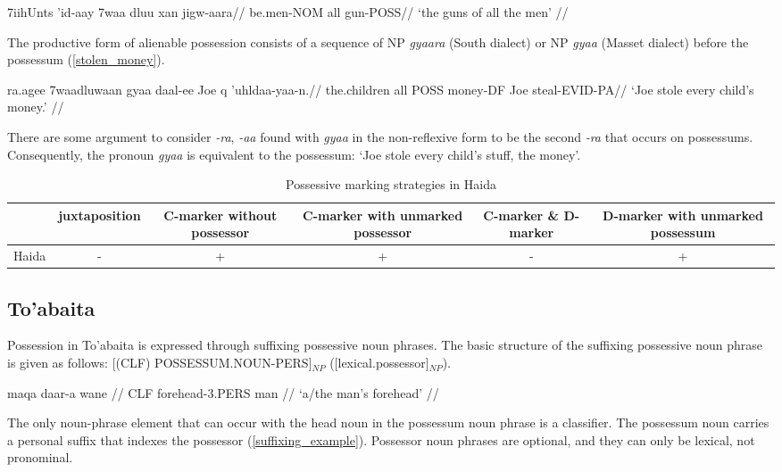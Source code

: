 \ex\label{guns_men}
\begingl
\gla 7iihUnts ’id-aay 7waa dluu xan jigw-aara//
\glb be.men-NOM all gun-POSS//
\glft ‘the guns of all the men’ //
\endgl
\xe

The productive form of alienable possession consists of a sequence of NP \textit{gyaara} (South dialect) or NP \textit{gyaa} (Masset dialect) before the possessum (\ref{stolen_money}). 

\ex\label{stolen_money}
\begingl
\gla ra.agee 7waadluwaan gyaa daal-ee Joe q ’uhldaa-yaa-n.//
\glb the.children all POSS money-DF Joe steal-EVID-PA//
\glft ‘Joe stole every child’s money.’ //
\endgl
\xe

There are some argument to consider \textit{-ra}, \textit{-aa} found with \textit{gyaa} in the non-reflexive form to be the second \textit{-ra} that occurs on possessums. Consequently, the pronoun \textit{gyaa} is equivalent to the possessum: ‘Joe stole every child’s stuff, the money’.


\begin{table}[h!]
	\centering
	\small
	\begin{tabular}{@{}cccccc@{}}
		\toprule
		& juxtaposition & \parbox{2.5cm}{C-marker without possessor} & \parbox{2.75cm}{C-marker with unmarked possessor} & \parbox{1.75cm}{C-marker \& D-marker} & \parbox{3cm}{D-marker with unmarked possessum} \\ \midrule
		Haida & - & + & + & - & + \\ \bottomrule
	\end{tabular}
	\caption{Possessive marking strategies in Haida}
\end{table}

\subsection{To'abaita}

Possession in To'abaita is expressed through suffixing possessive noun phrases. The basic structure of the suffixing possessive noun phrase is given as follows: [(CLF) POSSESSUM.NOUN-PERS]$_{NP}$ ([lexical.possessor]$_{NP}$).

\ex
\label{suffixing_example}
\begingl
\gla maqa daar-a wane //
\glb CLF forehead-3.PERS man //
\glft ‘a/the man’s forehead’ //
\endgl
\xe

The only noun-phrase element that can occur with the head noun in the possessum noun phrase is a classifier. The possessum noun carries a personal suffix that indexes the possessor (\ref{suffixing_example}). Possessor noun phrases are optional, and they can only be lexical, not pronominal.

